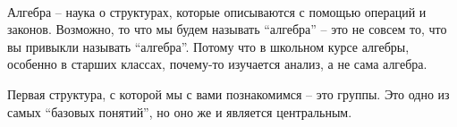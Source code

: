 \documentclass[10pt, twoside]{article}
\begin{document}
\pagestyle{empty}

\newpage

\tableofcontents
\pagebreak

\
\newpage

\setcounter{page}{1}
\pagestyle{fancy}

Алгебра -- наука о структурах, которые описываются с помощью операций и законов. 
Возможно, то что мы будем называть ``алгебра'' -- это не совсем то, что вы привыкли называть ``алгебра''. 
Потому что в школьном курсе алгебры, особенно в старших классах, почему-то изучается анализ, а не сама алгебра.

Первая структура, с которой мы с вами познакомимся -- это группы.
Это одно из самых ``базовых понятий'', но оно же и является центральным. 




\end{document}
